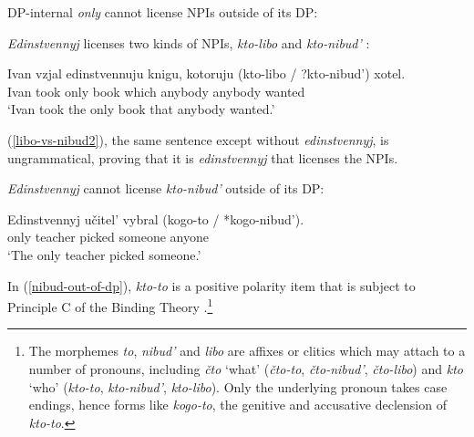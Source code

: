 DP-internal \textit{only} cannot license NPIs outside of its DP:

\begin{exe}
\end{exe}

\textit{Edinstvennyj} licenses two kinds of NPIs, \textit{kto-libo} \citep{pereltsvaig06} and \textit{kto-nibud'} \citep{russneg}:

\begin{exe}
	\ex \label{libo-vs-nibud} \gll Ivan vzjal edinstvennuju knigu, kotoruju (kto-libo / ?kto-nibud') xotel.\\
	Ivan took only book which anybody {} anybody wanted\\
	\glt `Ivan took the only book that anybody wanted.'
\end{exe}

(\ref{libo-vs-nibud2}), the same sentence except without \textit{edinstvennyj}, is ungrammatical, proving that it is \textit{edinstvennyj} that licenses the NPIs.

\begin{exe}
\end{exe}

\textit{Edinstvennyj} cannot license \textit{kto-nibud'} outside of its DP:

\begin{exe}
	\ex \label{nibud-out-of-dp} \gll Edinstvennyj u\v{c}itel' vybral (kogo-to / *kogo-nibud').\\
	only teacher picked someone {} anyone\\
	\glt `The only teacher picked someone.'
\end{exe}

In (\ref{nibud-out-of-dp}), \textit{kto-to}	is a positive polarity item that is subject to Principle C of the Binding Theory \citep{russneg}.\footnote{The morphemes \textit{to}, \textit{nibud'} and \textit{libo} are affixes or clitics which may attach to a number of pronouns, including \textit{\v{c}to} `what' (\textit{\v{c}to-to}, \textit{\v{c}to-nibud'}, \textit{\v{c}to-libo}) and \textit{kto} `who' (\textit{kto-to}, \textit{kto-nibud'}, \textit{kto-libo}). Only the underlying pronoun takes case endings, hence forms like \textit{kogo-to}, the genitive and accusative declension of \textit{kto-to}.}

